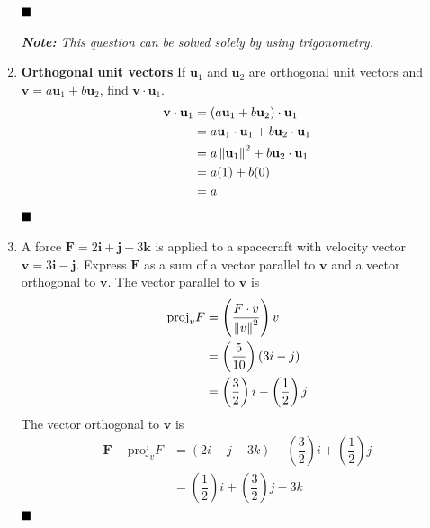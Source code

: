 \begin{enumerate}
          $\hfill\blacksquare$

          \textit{\textbf{Note: } This question can be solved solely by using trigonometry.}

          \newpage
          \setcounter{enumi}{28}
    \item \textbf{Orthogonal unit vectors} If $\mathbf{u}_1$ and $\mathbf{u}_2$ are orthogonal unit vectors and $\mathbf{v}=a \mathbf{u}_1+b \mathbf{u}_2$, find $\mathbf{v} \cdot \mathbf{u}_1$.
          \sol{}
          \begin{align*}
              \mathbf{v} \cdot \mathbf{u}_1 & = (a \mathbf{u}_1+b \mathbf{u}_2) \cdot \mathbf{u}_1                  \\
                                            & = a \mathbf{u}_1 \cdot \mathbf{u}_1+b \mathbf{u}_2 \cdot \mathbf{u}_1 \\
                                            & = a \left\lVert\mathbf{u}_1\right\rVert^2 + b \mathbf{u}_2 \cdot \mathbf{u}_1         \\
                                            & = a(1) + b(0)                                                         \\
                                            & = a
          \end{align*}
          $\hfill\blacksquare$

    \item A force $\mathbf{F}=2 \mathbf{i}+\mathbf{j}-3 \mathbf{k}$ is applied to a
          spacecraft with velocity vector $\mathbf{v}=3 \mathbf{i}-\mathbf{j}$. Express
          $\mathbf{F}$ as a sum of a vector parallel to $\mathbf{v}$ and a vector
          orthogonal to $\mathbf{v}$. \sol{} The vector parallel to $\mathbf{v}$ is
          \begin{align*}
              \text{proj}_v F & = \left(\dfrac{F \cdot v}{\left\lVert v\right\rVert^2}\right)v             \\
                              & = \left(\dfrac{5}{10}\right)(3i - j)                      \\
                              & = \left(\dfrac{3}{2}\right)i - \left(\dfrac{1}{2}\right)j
          \end{align*}
          The vector orthogonal to $\mathbf{v}$ is
          \begin{align*}
              \mathbf{F} - \text{proj}_v F & = \left(2i + j - 3k\right) - \left(\dfrac{3}{2}\right)i + \left(\dfrac{1}{2}\right)j \\
                                           & = \left(\dfrac{1}{2}\right)i + \left(\dfrac{3}{2}\right)j - 3k
          \end{align*}
          $\hfill\blacksquare$

\end{enumerate}

